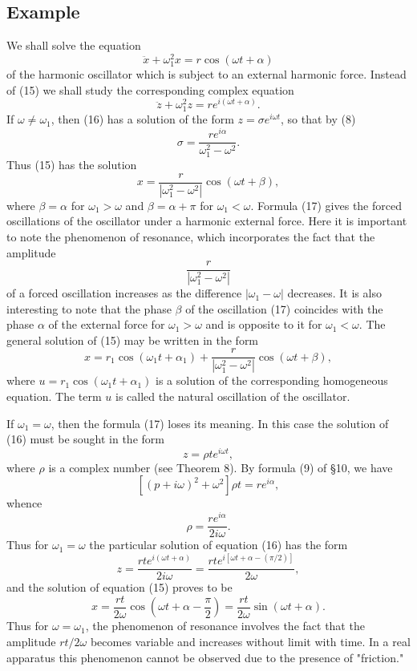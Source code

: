 \documentclass[10pt,a5paper]{book}
\theoremstyle{plain}
\theoremstyle{definition}
\theoremstyle{remark}
\begin{document}
\subsection*{Example}
We shall solve the equation
\begin{equation*}
\ddot{x}+\omega_{1}^{2} x=r \cos (\omega t+\alpha) \tag{15}
\end{equation*}
of the harmonic oscillator which is subject to an external harmonic force. Instead of (15) we shall study the corresponding complex equation
\begin{equation*}
\ddot{z}+\omega_{1}^{2} z=r e^{i(\omega t+\alpha)} . \tag{16}
\end{equation*}
If $\omega \neq \omega_{1}$, then (16) has a solution of the form $z=\sigma e^{i \omega t}$, so that by (8)
\[
\sigma=\frac{r e^{i \alpha}}{\omega_{1}^{2}-\omega^{2}} .
\]
Thus (15) has the solution
\begin{equation*}
x=\frac{r}{\left|\omega_{1}^{2}-\omega^{2}\right|} \cos (\omega t+\beta), \tag{17}
\end{equation*}
where $\beta=\alpha$ for $\omega_{1}>\omega$ and $\beta=\alpha+\pi$ for $\omega_{1}<\omega$. Formula (17) gives the forced oscillations of the oscillator under a harmonic external force. Here it is important to note the phenomenon of resonance, which incorporates the fact that the amplitude
\[
\frac{r}{\left|\omega_{1}^{2}-\omega^{2}\right|}
\]
of a forced oscillation increases as the difference $\left|\omega_{1}-\omega\right|$ decreases. It is also interesting to note that the phase $\beta$ of the oscillation (17) coincides with the phase $\alpha$ of the external force for $\omega_{1}>\omega$ and is opposite to it for $\omega_{1}<\omega$. The general solution of (15) may be written in the form
\[
x=r_{1} \cos \left(\omega_{1} t+\alpha_{1}\right)+\frac{r}{\left|\omega_{1}^{2}-\omega^{2}\right|} \cos (\omega t+\beta),
\]
where $u=r_{1} \cos \left(\omega_{1} t+\alpha_{1}\right)$ is a solution of the corresponding homogeneous equation. The term $u$ is called the natural oscillation of the oscillator.

If $\omega_{1}=\omega$, then the formula (17) loses its meaning. In this case the solution of (16) must be sought in the form
\[
z=\rho t e^{i \omega t},
\]
where $\rho$ is a complex number (see Theorem 8). By formula (9) of §10, we have
\[
\left[(p+i \omega)^{2}+\omega^{2}\right] \rho t=r e^{i \alpha},
\]
whence
\[
\rho=\frac{r e^{i \alpha}}{2 i \omega} .
\]
Thus for $\omega_{1}=\omega$ the particular solution of equation (16) has the form
\[
z=\frac{r t e^{i(\omega t+\alpha)}}{2 i \omega}=\frac{r t e^{i[\omega t+\alpha-(\pi / 2)]}}{2 \omega},
\]
and the solution of equation (15) proves to be
\[
x=\frac{r t}{2 \omega} \cos \left(\omega t+\alpha-\frac{\pi}{2}\right)=\frac{r t}{2 \omega} \sin (\omega t+\alpha) .
\]
Thus for $\omega=\omega_{1}$, the phenomenon of resonance involves the fact that the amplitude $r t / 2 \omega$ becomes variable and increases without limit with time. In a real apparatus this phenomenon cannot be observed due to the presence of "friction."
\end{document}
